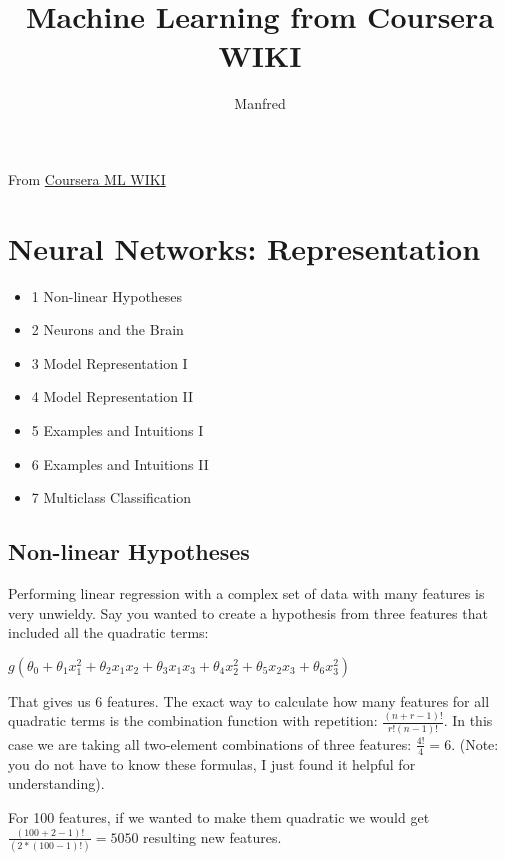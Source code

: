 \documentclass{article}
\author{Manfred}
\title{Machine Learning from Coursera WIKI}
\begin{document}
\maketitle
\newpage

\tableofcontents
\newpage

\listoftables
\newpage

\listoffigures
\newpage

From \href{https://share.coursera.org/wiki/index.php/ML:Main}{Coursera ML WIKI}

\section{Neural Networks: Representation}

\begin{itemize}

\item    1 Non-linear Hypotheses
\item    2 Neurons and the Brain
\item    3 Model Representation I
\item    4 Model Representation II
\item    5 Examples and Intuitions I
\item    6 Examples and Intuitions II
\item    7 Multiclass Classification
\end{itemize}
\subsection{Non-linear Hypotheses}

Performing linear regression with a complex set of data with many features is very unwieldy. Say you wanted to create a hypothesis from three features that included all the quadratic terms:

$g(\theta_0+\theta_1x_1^2+\theta_2x_1x_2+\theta_3x_1x_3+\theta_4x_2^2+\theta_5x_2x_3+\theta_6x_3^2)$

That gives us 6 features. The exact way to calculate how many features for all quadratic terms is the combination function with repetition: $\frac{(n+r−1)!}{r!(n−1)!}$. In this case we are taking all two-element combinations of three features: $\frac{4!}{4}=6$. (Note: you do not have to know these formulas, I just found it helpful for understanding).

For 100 features, if we wanted to make them quadratic we would get $\frac{(100+2−1)!}{(2*(100−1)!)}=5050$ resulting new features.
\end{document}

